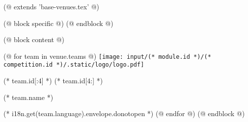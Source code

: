 (@ extends 'base-venues.tex' @)

(@ block specific @)
    \geometry{paper=c5paper, landscape}
(@ endblock @)

(@ block content @)
    \pagestyle{empty}
    \centering

    (@ for team in venue.teams @)
        \texttt{[image: input/(* module.id *)/(* competition.id *)/.static/logo/logo.pdf]}%
        \vspace*{5mm}

        \fontsize{60}{0}\selectfont%
        (* team.id[:4] *)%
        \fontsize{80}{0}\selectfont%
        (* team.id[4:] *)%

        \vspace{5mm}
        \fontsize{15}{0}\selectfont
        (* team.name *)

        \vspace{15mm}
        \normalsize
        (* i18n.get(team.language).envelope.donotopen *)
        \newpage
    (@ endfor @)
(@ endblock @)
